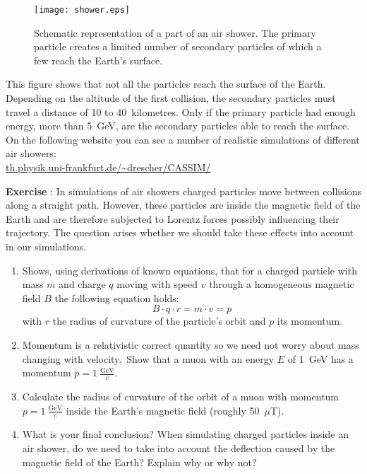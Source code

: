 \begin{figure}\begin{center}
\texttt{[image: shower.eps]}%
\caption{Schematic representation of a part of an air shower. The primary particle creates a limited number of secondary particles of which a few reach the Earth's surface.}\label{fig:shower}
\end{center}\end{figure}

This figure shows that not all the particles reach the surface of the Earth. Depending on the altitude of the first collision, the secondary particles must travel a distance of 10 to 40~kilometres. Only if the primary particle had enough energy, more than 5~GeV, are the secondary particles able to reach the surface. On the following website you can see a number of realistic simulations of different air showers:\\
\url{th.physik.uni-frankfurt.de/\~drescher/CASSIM/}

\begin{shaded}
\textbf{Exercise \theExercise {}} : In simulations of air showers charged particles move between collisions along a straight path. However, these particles are inside the magnetic field of the Earth and are therefore subjected to Lorentz forces possibly influencing their trajectory. The question arises whether we should take these effects into account in our simulations.
\begin{enumerate}[-]
\item Shows, using derivations of known equations, that for a charged particle with mass $m$ and charge $q$ moving with speed $v$ through a homogeneous magnetic field $B$ the following equation holds:
\begin{equation}
B \cdot q \cdot r = m \cdot v = p
\end{equation}
with $r$ the radius of curvature of the particle's orbit and $p$ its momentum.
\item Momentum is a relativistic correct quantity so we need not worry about mass changing with velocity.\footnotemark~Show that a muon with an energy $E$ of 1~GeV has a momentum $p=1~\frac{\mbox{GeV}}{c}$.
\item Calculate the radius of curvature of the orbit of a muon with momentum $p=1~\frac{\mbox{GeV}}{c}$ inside the Earth's magnetic field (roughly 50~$\mu$T).
\item What is your final conclusion? When simulating charged particles inside an air shower, do we need to take into account the deflection caused by the magnetic field of the Earth? Explain why or why not?
\end{enumerate}\end{shaded}

